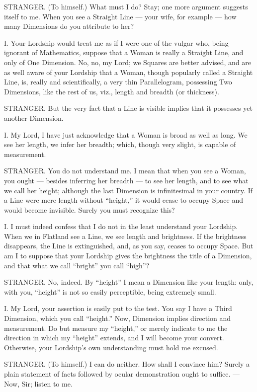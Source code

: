 \documentclass[12pt, a4paper, twoside]{memoir}
\begin{document}
STRANGER. (To himself.) What must I do? Stay; one more argument suggests
itself to me. When you see a Straight Line --- your wife, for example --- how many
Dimensions do you attribute to her?

I. Your Lordship would treat me as if I were one of the vulgar who, being
ignorant of Mathematics, suppose that a Woman is really a Straight Line, and
only of One Dimension. No, no, my Lord; we Squares are better advised, and are
as well aware of your Lordship that a Woman, though popularly called a
Straight Line, is, really and scientifically, a very thin Parallelogram,
possessing Two Dimensions, like the rest of us, viz., length and breadth (or
thickness).

STRANGER. But the very fact that a Line is visible implies that it possesses
yet another Dimension.

I. My Lord, I have just acknowledge that a Woman is broad as well as long. We
see her length, we infer her breadth; which, though very slight, is capable of
measurement.

STRANGER. You do not understand me. I mean that when you see a Woman, you
ought --- besides inferring her breadth --- to see her length, and to see what we
call her height; although the last Dimension is infinitesimal in your country.
If a Line were mere length without ``height,'' it would cease to occupy Space
and would become invisible. Surely you must recognize this?

I. I must indeed confess that I do not in the least understand your Lordship.
When we in Flatland see a Line, we see length and brightness. If the
brightness disappears, the Line is extinguished, and, as you say, ceases to
occupy Space. But am I to suppose that your Lordship gives the brightness the
title of a Dimension, and that what we call ``bright'' you call ``high''?

STRANGER. No, indeed. By ``height'' I mean a Dimension like your length: only,
with you, ``height'' is not so easily perceptible, being extremely small.

I. My Lord, your assertion is easily put to the test. You say I have a Third
Dimension, which you call ``height.'' Now, Dimension implies direction and
measurement. Do but measure my ``height,'' or merely indicate to me the
direction in which my ``height'' extends, and I will become your convert.
Otherwise, your Lordship's own understanding must hold me excused.

STRANGER. (To himself.) I can do neither. How shall I convince him? Surely a
plain statement of facts followed by ocular demonstration ought to suffice. ---
Now, Sir; listen to me.
\end{document}
